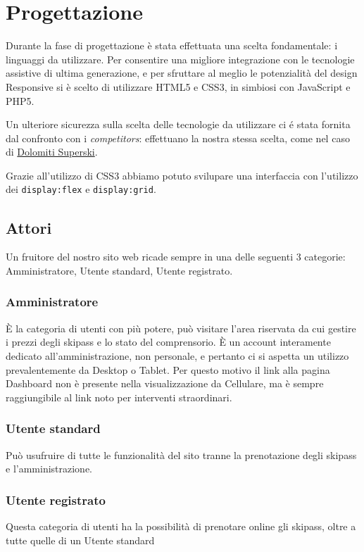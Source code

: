 \section{Progettazione}
Durante la fase di progettazione è stata effettuata una scelta fondamentale: i linguaggi da utilizzare. Per consentire una migliore integrazione con le tecnologie assistive di ultima generazione, e per sfruttare al meglio le potenzialità del design Responsive
si è scelto di utilizzare HTML5 e CSS3, in simbiosi con JavaScript e PHP5.

Un ulteriore sicurezza sulla scelta delle tecnologie da utilizzare  ci é stata fornita dal confronto con i \textit{competitors}: effettuano la nostra stessa scelta, come nel caso di \href{www.dolomitisuperski.com}{Dolomiti Superski}.

Grazie all'utilizzo di CSS3 abbiamo potuto svilupare una interfaccia con l'utilizzo dei \verb|display:flex| e \verb|display:grid|.


\subsection{Attori}
Un fruitore del nostro sito web ricade sempre in una delle seguenti 3 categorie: Amministratore, Utente standard, Utente registrato.
\subsubsection{Amministratore}
È la categoria di utenti con più potere, può visitare l'area riservata da cui gestire i prezzi degli skipass e lo stato del comprensorio.
È un account interamente dedicato all'amministrazione, non personale, e pertanto ci si aspetta un utilizzo prevalentemente da Desktop o Tablet. Per questo motivo il link alla pagina Dashboard non è presente nella visualizzazione da Cellulare, ma è sempre raggiungibile al link noto per interventi straordinari.
\subsubsection{Utente standard}
Può usufruire di tutte le funzionalità del sito tranne la prenotazione degli skipass e l'amministrazione.
\subsubsection{Utente registrato}
Questa categoria di utenti ha la possibilità di prenotare online gli skipass, oltre a tutte quelle di un Utente standard

